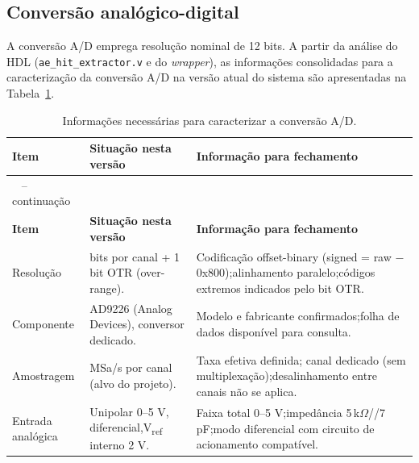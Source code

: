 \subsection{Conversão analógico-digital}
\label{v2:subsec:conversao_ad}

A conversão A/D emprega resolução nominal de 12 bits. A partir da análise do HDL (\texttt{ae\_hit\_extractor.v} e do \textit{wrapper}), as informações consolidadas para a caracterização da conversão A/D na versão atual do sistema são apresentadas na Tabela~\ref{v2:tab:caracterizacao_adc}.

\begingroup
\footnotesize
\renewcommand{\arraystretch}{1.2}
\begin{longtable}{
		|>{\raggedright\arraybackslash}p{}
		|>{\raggedright\arraybackslash}p{}
		|>{\raggedright\arraybackslash}p{}|}
	\caption{Informações necessárias para caracterizar a conversão A/D.}
	\label{v2:tab:caracterizacao_adc}\\
	\hline
	\textbf{Item} & \textbf{Situação nesta versão} & \textbf{Informação para fechamento} \\
	\hline
	\endfirsthead
	\multicolumn{3}{c}
	{\tablename\ \thetable{} -- continuação}\\
	\hline
	\textbf{Item} & \textbf{Situação nesta versão} & \textbf{Informação para fechamento} \\
	\hline
	\endhead
	\hline
	\endlastfoot
	Resolução & 12 bits por canal + 1 bit OTR (over-range). & Codificação offset-binary (signed = raw $-$ 0x800);\newline alinhamento paralelo;\newline códigos extremos indicados pelo bit OTR. \\
	\hline
	Componente & AD9226 (Analog Devices),\newline 1 conversor dedicado. & Modelo e fabricante confirmados;\newline folha de dados disponível para consulta. \\
	\hline
	Amostragem & 10 MSa/s por canal (alvo do projeto). & Taxa efetiva definida;\newline 1 canal dedicado (sem multiplexação);\newline desalinhamento entre canais não se aplica. \\
	\hline
	Entrada analógica & Unipolar 0--5 V, diferencial,\newline V\textsubscript{ref} interno 2 V. & Faixa total 0--5 V;\newline impedância 5\,k$\Omega$//7\,pF;\newline modo diferencial com circuito de acionamento compatível. \\

\end{longtable}
